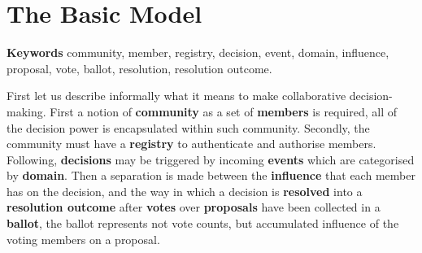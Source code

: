 
\section{The Basic Model}

\textbf{Keywords} community, member, registry, decision, event, domain, influence, proposal, vote, ballot, resolution, resolution outcome.

First let us describe informally what it means to make collaborative decision-making. First a notion of \textbf{community} as a set of \textbf{members} is required, all of the decision power is encapsulated within such community. Secondly, the community must have a \textbf{registry} to authenticate and authorise members. Following, \textbf{decisions} may be triggered by incoming \textbf{events} which are categorised by \textbf{domain}. Then a separation is made between the \textbf{influence} that each member has on the decision, and the way in which a decision is \textbf{resolved} into a \textbf{resolution outcome} after \textbf{votes} over \textbf{proposals} have been collected in a \textbf{ballot}, the ballot represents not vote counts, but accumulated influence of the voting members on a proposal.